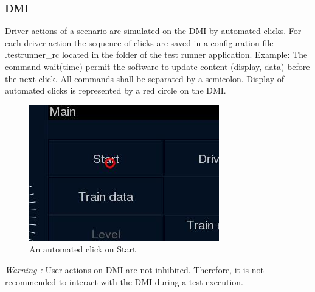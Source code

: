 \documentclass{template/openetcs}
\begin{document}
\subsubsection{DMI}
Driver actions of a scenario are simulated on the DMI by automated clicks. For each driver action the sequence of clicks are saved in a configuration file .testrunner\_rc located in the folder of the test runner application.
\newline
\newline 
Example:
\newline 
{}
\newline
\newline  
The command wait(time) permit the software to update content (display, data) before the next click. All commands shall be separated by a semicolon.
Display of automated clicks is represented by a red circle on the DMI.
\newline 
\begin{figure}[!h]
  \centering
  \includegraphics{image/test_runner_auto_click}
  \caption{An automated click on Start}
  \label{fig:An automated click on Start}
\end{figure}
\newline 
\emph{Warning :} User actions on DMI are not inhibited. Therefore, it is not recommended to interact with the DMI during a test execution.
\newpage
\end{document}
